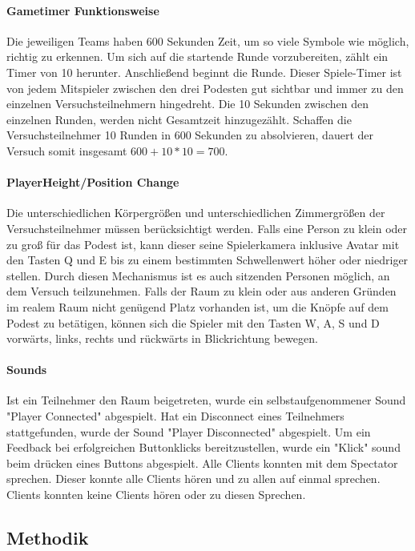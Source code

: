 \documentclass[a4paper,11pt]{article}%
\renewcommand{\\}{\vspace*{0.5\baselineskip} \newline}
\begin{document}
\paragraph{Gametimer Funktionsweise}
Die jeweiligen Teams haben 600 Sekunden Zeit, um so viele Symbole wie möglich, richtig zu erkennen. Um sich auf die startende Runde vorzubereiten, zählt ein Timer von 10 herunter. Anschließend beginnt die Runde. Dieser Spiele-Timer ist von jedem Mitspieler zwischen den drei Podesten gut sichtbar und immer zu den einzelnen Versuchsteilnehmern hingedreht. Die 10 Sekunden zwischen den einzelnen Runden, werden nicht Gesamtzeit hinzugezählt. Schaffen die Versuchsteilnehmer 10 Runden in 600 Sekunden zu absolvieren, dauert der Versuch somit insgesamt \\
$600 + 10 * 10 = 700$.

\paragraph{PlayerHeight/Position Change}
Die unterschiedlichen Körpergrößen und unterschiedlichen Zimmergrößen der Versuchsteilnehmer müssen berücksichtigt werden.
Falls eine Person zu klein oder zu groß für das Podest ist, kann dieser seine Spielerkamera inklusive Avatar mit den Tasten Q und E bis zu einem bestimmten Schwellenwert höher oder niedriger stellen. Durch diesen Mechanismus ist es auch sitzenden Personen möglich, an dem Versuch teilzunehmen.
Falls der Raum zu klein oder aus anderen Gründen im realem Raum nicht genügend Platz vorhanden ist, um die Knöpfe auf dem Podest zu betätigen, können sich die Spieler mit den Tasten W, A, S und D vorwärts, links, rechts und rückwärts in Blickrichtung bewegen.

\paragraph{Sounds}
Ist ein Teilnehmer den Raum beigetreten, wurde ein selbstaufgenommener Sound "Player Connected" abgespielt. Hat ein Disconnect eines Teilnehmers stattgefunden, wurde der Sound "Player Disconnected" abgespielt.
Um ein Feedback bei erfolgreichen Buttonklicks bereitzustellen, wurde ein "Klick" sound beim drücken eines Buttons abgespielt.
Alle Clients konnten mit dem Spectator sprechen. Dieser konnte alle Clients hören und zu allen auf einmal sprechen. Clients konnten keine Clients hören oder zu diesen Sprechen.
	
\subsection{Methodik}
\end{document}
